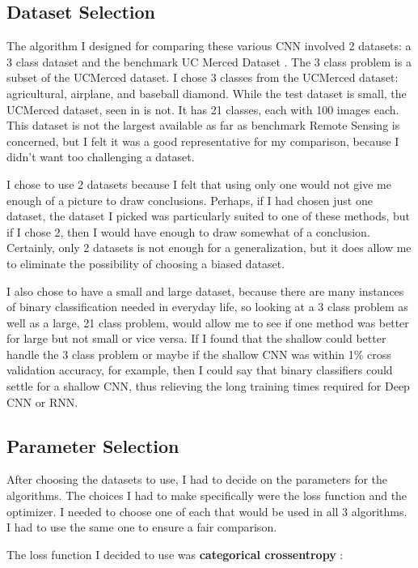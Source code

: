\documentclass[12pt]{article}
\begin{document}
	\subsection{Dataset Selection}
The algorithm I designed for comparing these various CNN involved 2 datasets: a 3 class dataset and the benchmark UC Merced Dataset \cite{ucm}. The 3 class problem is a subset of the UCMerced dataset. I chose 3 classes from the UCMerced dataset: agricultural, airplane, and baseball diamond. While the test dataset is small, the UCMerced dataset, seen in  is not. It has 21 classes, each with 100 images each. This dataset is not the largest available as far as benchmark Remote Sensing is concerned, but I felt it was a good representative for my comparison, because I didn't want too challenging a dataset. 

I chose to use 2 datasets because I felt that using only one would not give me enough of a picture to draw conclusions. Perhaps, if I had chosen just one dataset, the dataset I picked was particularly suited to one of these methods, but if I chose 2, then I would have enough to draw somewhat of a conclusion. Certainly, only 2 datasets is not enough for a generalization, but it does allow me to eliminate the possibility of choosing a biased dataset.

I also chose to have a small and large dataset, because there are many instances of binary classification needed in everyday life, so looking at a 3 class problem as well as a large, 21 class problem, would allow me to see if one method was better for large but not small or vice versa. If I found that the shallow could better handle the 3 class problem or maybe if the shallow CNN was within 1\% cross validation accuracy, for example, then I could say that binary classifiers could settle for a shallow CNN, thus relieving the long training times required for Deep CNN or RNN. 

	\subsection{Parameter Selection}
After choosing the datasets to use, I had to decide on the parameters for the algorithms. The choices I had to make specifically were the loss function and the optimizer. I needed to choose one of each that would be used in all 3 algorithms. I had to use the same one to ensure a fair comparison. 

The loss function I decided to use was \textbf{categorical crossentropy} \cite{cross_entropy}: 
		
\end{document}
